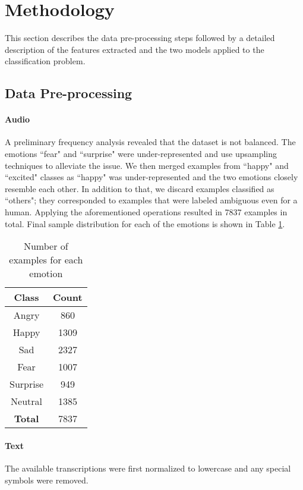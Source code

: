 \documentclass[conference]{IEEEtran}
\begin{document}
\section{Methodology}
This section describes the data pre-processing steps followed by a detailed description of the features extracted and the two models applied to the classification problem.
\subsection{Data Pre-processing}
\paragraph{Audio} A preliminary frequency analysis revealed that the dataset is not balanced. The emotions ``fear" and ``surprise" were under-represented and use upsampling techniques to alleviate the issue. We then merged examples from ``happy" and ``excited" classes as ``happy"  was under-represented and the two emotions closely resemble each other. In addition to that, we discard examples classified as ``others"; they corresponded to examples that were labeled ambiguous even for a human. Applying the aforementioned operations resulted in 7837 examples in total. Final sample distribution for each of the emotions is shown in Table \ref{tab:emo_freq}.

\begin{table}[]
    \centering
    \caption{Number of examples for each emotion}
    \begin{tabular}{|c|c|}
        \hline
        \textbf{Class} & \textbf{Count} \\
        \hline
        Angry & 860 \\
        \hline
        Happy & 1309 \\
        \hline
        Sad & 2327 \\
        \hline
        Fear & 1007 \\
        \hline
        Surprise & 949 \\
        \hline
        Neutral & 1385 \\
        \hline
        \textbf{Total} & 7837 \\
        \hline
    \end{tabular}
    \label{tab:emo_freq}
\end{table}

\paragraph{Text} The available transcriptions were first normalized to lowercase and any special symbols were removed.
\end{document}
